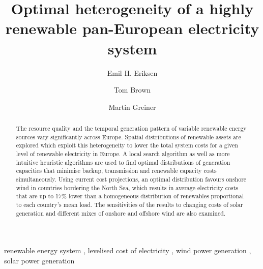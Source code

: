 \documentclass[a4paper, 5p, sort&compress]{elsarticle}%
\begin{document}

\begin{frontmatter}

\title{Optimal heterogeneity of a highly renewable pan-European electricity system}

\author[label1]{Emil H. Eriksen}
\author[label2]{Tom Brown}
\author[label3]{Martin Greiner}
\address[label1]{Department of Physics and Astronomy, Aarhus University, 8000 Aarhus C,  Denmark}
\address[label2]{Frankfurt Institute of Advanced Studies (FIAS), Johann Wolfgang Goethe Universit\"at, Ruth-Moufang-Straße 1, 60438 Frankfurt am Main, Germany}
\address[label3]{Department of Engineering, Aarhus University, 8200 Aarhus,  Denmark}



\begin{abstract}
  The resource quality and the temporal generation pattern of variable
  renewable energy sources vary significantly across Europe. Spatial
  distributions of renewable assets are explored which exploit this
  heterogeneity to lower the total system costs for a given level of
  renewable electricity in Europe. A local search algorithm as well as
  more intuitive heuristic algorithms are used to find optimal
  distributions of generation capacities that minimise backup,
  transmission and renewable capacity costs simultaneously. Using
  current cost projections, an optimal distribution favours onshore
  wind in countries bordering the North Sea, which results in average
  electricity costs that are up to 17\% lower than a homogeneous
  distribution of renewables proportional to each country's mean
  load. The sensitivities of the results to changing costs of solar
  generation and different mixes of onshore and offshore wind are also
  examined.

\end{abstract}

\begin{keyword}
renewable energy system \sep
levelised cost of electricity \sep
wind power generation \sep
solar power generation
\end{keyword}

\end{frontmatter}


\end{document}
